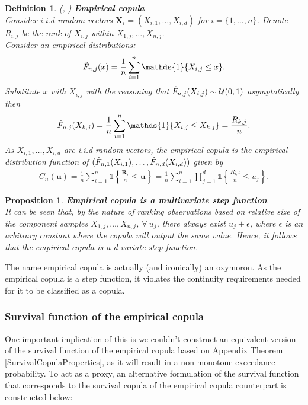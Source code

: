 \documentclass[12pt]{report}
\newtheorem{proposition}{Proposition}[section]
\newtheorem{definition}{Definition}[subsection]
\newcommand{\1}{\mathbf{1}}
\begin{document}
\begin{flushleft}
\begin{definition}\label{ECDef}
\textit{(\normalfont\cite{DeheuvelsEC}, \normalfont\cite{SegersEBC})}
\:\textbf{Empirical copula} \\
Consider i.i.d random vectors $\boldsymbol{X}_{i} = (X_{i,1}, \dots, X_{i,d})$ for $i = \{1, \dots, n \}$. Denote $R_{i,j}$ be the rank of $X_{i,j}$ within $X_{1,j}, \dots, X_{n,j}$.\\
Consider an empirical distributions:
\begin{align*}
\Hat{F}_{n,j}(x) = \frac{1}{n} \sum\limits_{i = 1}^{n} \mathds{1}\{X_{i,j} \le x\}.
\end{align*}
Substitute $x$ with $X_{i,j}$ with the reasoning that $\Hat{F}_{n,j}(X_{i,j}) \sim \mathcal{U}(0,1)$ asymptotically then
\begin{align*}
\Hat{F}_{n,j}(X_{k,j}) = \frac{1}{n} \sum\limits_{i = 1}^{n} \mathds{1}\{X_{i,j} \le X_{k,j}\} = \frac{R_{k,j}}{n}.
\end{align*}
As $X_{i,1}, \dots, X_{i,d}$ are i.i.d random vectors, the empirical copula is the empirical distribution function of $(\Hat{F}_{n,1}(X_{i,1}), \dots, \Hat{F}_{n,d}(X_{i,d}))$ given by
\begin{align*}
C_{n}(\boldsymbol{u}) = \frac{1}{n} \sum\limits_{i = 1}^{n} \mathds{1}\left\{ \frac{\boldsymbol{R}_{i}}{n} \le \boldsymbol{u} \right\} = \frac{1}{n} \sum\limits_{i = 1}^{n} \prod\limits_{j = 1}^{d} \mathds{1}\left\{ \frac{R_{i,j}}{n} \le u_{j} \right\}.
\end{align*}
\end{definition}
\vspace{0.5cm}
\begin{proposition}\label{ECisStepFunction}
\textbf{Empirical copula is a multivariate step function} \\
It can be seen that, by the nature of ranking observations based on relative size of the component samples $X_{1,j}, \dots, X_{n,j}$, $\forall \: u_{j}$, there always exist $u_{j} + \epsilon$, where $\epsilon$ is an arbitrary constant where the copula will output the same value. Hence, it follows that the empirical copula is a d-variate step function.  
\end{proposition}

The name empirical copula is actually (and ironically) an oxymoron. As the empirical copula is a step function, it violates the continuity requirements needed for it to be classified as a copula.\\

\newpage
\subsubsection{Survival function of the empirical copula}
\vspace{0.5cm}
One important implication of this is we couldn't construct an equivalent version of the survival function of the empirical copula based on Appendix Theorem \ref{SurvivalCopulaProperties}, as it will result in a non-monotone exceedance probability. To act as a proxy, an alternative formulation of the survival function that corresponds to the survival copula of the empirical copula counterpart is constructed below:


\end{flushleft}
\end{document}

